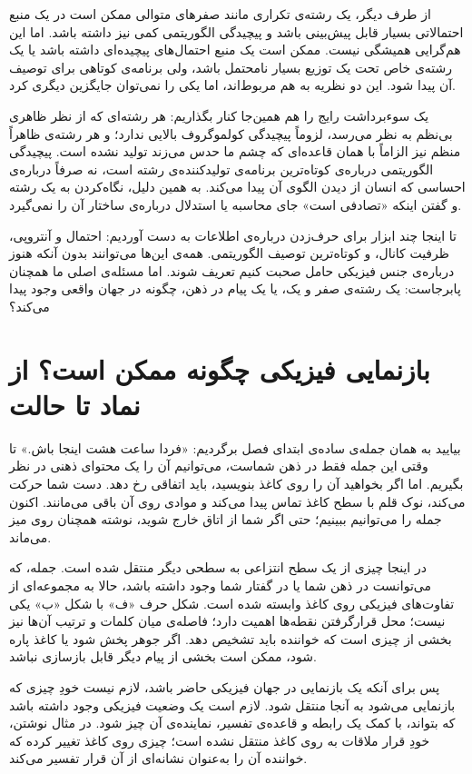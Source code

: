 از طرف دیگر، یک رشته‌ی تکراری مانند صفرهای متوالی ممکن است در یک منبع احتمالاتی بسیار قابل پیش‌بینی باشد و پیچیدگی الگوریتمی کمی نیز داشته باشد. اما این هم‌گرایی همیشگی نیست. ممکن است یک منبع احتمال‌های پیچیده‌ای داشته باشد یا یک رشته‌ی خاص تحت یک توزیع بسیار نامحتمل باشد، ولی برنامه‌ی کوتاهی برای توصیف آن پیدا شود. این دو نظریه به هم مربوط‌اند، اما یکی را نمی‌توان جایگزین دیگری کرد. \autocite{kolmogorov1965,cover2006,livitanyi2008}

یک سوءبرداشت رایج را هم همین‌جا کنار بگذاریم: هر رشته‌ای که از نظر ظاهری بی‌نظم به نظر می‌رسد، لزوماً پیچیدگی کولموگروف بالایی ندارد؛ و هر رشته‌ی ظاهراً منظم نیز الزاماً با همان قاعده‌ای که چشم ما حدس می‌زند تولید نشده است. پیچیدگی الگوریتمی درباره‌ی کوتاه‌ترین برنامه‌ی تولیدکننده‌ی رشته است، نه صرفاً درباره‌ی احساسی که انسان از دیدن الگوی آن پیدا می‌کند. به همین دلیل، نگاه‌کردن به یک رشته و گفتن اینکه «تصادفی است» جای محاسبه یا استدلال درباره‌ی ساختار آن را نمی‌گیرد.

تا اینجا چند ابزار برای حرف‌زدن درباره‌ی اطلاعات به دست آوردیم: احتمال و آنتروپی، ظرفیت کانال، و کوتاه‌ترین توصیف الگوریتمی. همه‌ی این‌ها می‌توانند بدون آنکه هنوز درباره‌ی جنس فیزیکی حامل صحبت کنیم تعریف شوند. اما مسئله‌ی اصلی ما همچنان پابرجاست: یک رشته‌ی صفر و یک، یا یک پیام در ذهن، چگونه در جهان واقعی وجود پیدا می‌کند؟

\section{بازنمایی فیزیکی چگونه ممکن است؟ از نماد تا حالت}
\label{sec:physical-representation}

بیایید به همان جمله‌ی ساده‌ی ابتدای فصل برگردیم: «فردا ساعت هشت اینجا باش.» تا وقتی این جمله فقط در ذهن شماست، می‌توانیم آن را یک محتوای ذهنی در نظر بگیریم. اما اگر بخواهید آن را روی کاغذ بنویسید، باید اتفاقی رخ دهد. دست شما حرکت می‌کند، نوک قلم با سطح کاغذ تماس پیدا می‌کند و موادی روی آن باقی می‌مانند. اکنون جمله را می‌توانیم ببینیم؛ حتی اگر شما از اتاق خارج شوید، نوشته همچنان روی میز می‌ماند.

در اینجا چیزی از یک سطح انتزاعی به سطحی دیگر منتقل شده است. جمله، که می‌توانست در ذهن شما یا در گفتار شما وجود داشته باشد، حالا به مجموعه‌ای از تفاوت‌های فیزیکی روی کاغذ وابسته شده است. شکل حرف «ف» با شکل «ب» یکی نیست؛ محل قرارگرفتن نقطه‌ها اهمیت دارد؛ فاصله‌ی میان کلمات و ترتیب آن‌ها نیز بخشی از چیزی است که خواننده باید تشخیص دهد. اگر جوهر پخش شود یا کاغذ پاره شود، ممکن است بخشی از پیام دیگر قابل بازسازی نباشد.

پس برای آنکه یک بازنمایی در جهان فیزیکی حاضر باشد، لازم نیست خودِ چیزی که بازنمایی می‌شود به آنجا منتقل شود. لازم است یک وضعیت فیزیکی وجود داشته باشد که بتواند، با کمک یک رابطه و قاعده‌ی تفسیر، نماینده‌ی آن چیز شود. در مثال نوشتن، خودِ قرار ملاقات به روی کاغذ منتقل نشده است؛ چیزی روی کاغذ تغییر کرده که خواننده آن را به‌عنوان نشانه‌ای از آن قرار تفسیر می‌کند.

